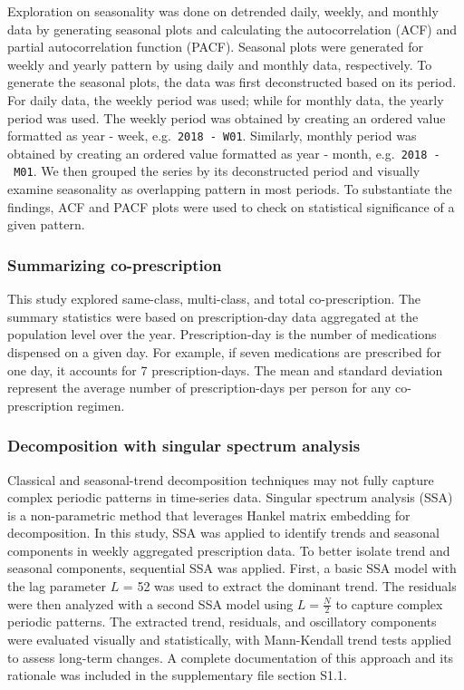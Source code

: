 \documentclass[
  authoryear,
  review]{elsarticle}
\begin{document}
Exploration on seasonality was done on detrended daily, weekly, and
monthly data by generating seasonal plots and calculating the
autocorrelation (ACF) and partial autocorrelation function (PACF).
Seasonal plots were generated for weekly and yearly pattern by using
daily and monthly data, respectively. To generate the seasonal plots,
the data was first deconstructed based on its period. For daily data,
the weekly period was used; while for monthly data, the yearly period
was used. The weekly period was obtained by creating an ordered value
formatted as year - week, e.g.~\texttt{2018\ -\ W01}. Similarly, monthly
period was obtained by creating an ordered value formatted as year -
month, e.g.~\texttt{2018\ -\ M01}. We then grouped the series by its
deconstructed period and visually examine seasonality as overlapping
pattern in most periods. To substantiate the findings, ACF and PACF
plots were used to check on statistical significance of a given pattern.

\subsubsection{Summarizing
co-prescription}\label{summarizing-co-prescription}

This study explored same-class, multi-class, and total co-prescription.
The summary statistics were based on prescription-day data aggregated at
the population level over the year. Prescription-day is the number of
medications dispensed on a given day. For example, if seven medications
are prescribed for one day, it accounts for 7 prescription-days. The
mean and standard deviation represent the average number of
prescription-days per person for any co-prescription regimen.

\subsubsection{Decomposition with singular spectrum
analysis}\label{decomposition-with-singular-spectrum-analysis}

Classical and seasonal-trend decomposition techniques may not fully
capture complex periodic patterns in time-series data. Singular spectrum
analysis (SSA) is a non-parametric method that leverages Hankel matrix
embedding for decomposition. In this study, SSA was applied to identify
trends and seasonal components in weekly aggregated prescription data.
To better isolate trend and seasonal components, sequential SSA was
applied. First, a basic SSA model with the lag parameter \(L\) = 52 was
used to extract the dominant trend. The residuals were then analyzed
with a second SSA model using \(L = \frac{N}{2}\) to capture complex
periodic patterns. The extracted trend, residuals, and oscillatory
components were evaluated visually and statistically, with Mann-Kendall
trend tests applied to assess long-term changes. A complete
documentation of this approach and its rationale was included in the
supplementary file section S1.1.
\end{document}

